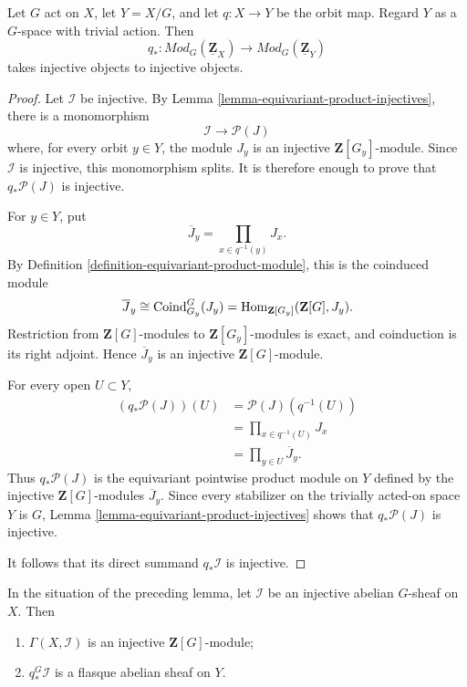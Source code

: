 \begin{lemma}
\label{lemma-pushforward-equivariant-injectives}
\begin{reference}
\cite[Chapter V, \S 5.1, Proposition 5.1.3, p. 198]{Tohoku}
\end{reference}
Let $G$ act on $X$, let $Y = X/G$, and let
$q : X \to Y$ be the orbit map. Regard $Y$ as a $G$-space with trivial
action. Then
$$
q_* :
\textit{Mod}_G(\underline{\mathbf{Z}}_X)
\longrightarrow
\textit{Mod}_G(\underline{\mathbf{Z}}_Y)
$$
takes injective objects to injective objects.
\end{lemma}

\begin{proof}
Let $\mathcal{I}$ be injective. By Lemma
\ref{lemma-equivariant-product-injectives}, there is a monomorphism
$$
\mathcal{I}\longrightarrow\mathcal{P}(J)
$$
where, for every orbit $y \in Y$, the module $J_y$ is an injective
$\mathbf{Z}[G_y]$-module. Since $\mathcal{I}$ is injective, this
monomorphism splits. It is therefore enough to prove that
$q_*\mathcal{P}(J)$ is injective.

For $y \in Y$, put
$$
\overline J_y = \prod_{x \in q^{-1}(y)}J_x.
$$
By Definition \ref{definition-equivariant-product-module}, this is the
coinduced module
$$
\overline J_y
\cong
\operatorname{Coind}_{G_y}^G(J_y)
=
\mathop{\mathrm{Hom}}\nolimits_{\mathbf{Z}[G_y]}(\mathbf{Z}[G], J_y).
$$
Restriction from $\mathbf{Z}[G]$-modules to
$\mathbf{Z}[G_y]$-modules is exact, and coinduction is its right adjoint.
Hence $\overline J_y$ is an injective $\mathbf{Z}[G]$-module.

For every open $U \subset Y$,
$$
\begin{aligned}
(q_*\mathcal{P}(J))(U)
&=
\mathcal{P}(J)(q^{-1}(U)) \\
&=
\prod_{x \in q^{-1}(U)}J_x \\
&=
\prod_{y \in U}\overline J_y.
\end{aligned}
$$
Thus $q_*\mathcal{P}(J)$ is the equivariant pointwise product module on
$Y$ defined by the injective $\mathbf{Z}[G]$-modules
$\overline J_y$. Since every stabilizer on the trivially acted-on space
$Y$ is $G$, Lemma \ref{lemma-equivariant-product-injectives} shows that
$q_*\mathcal{P}(J)$ is injective.

It follows that its direct summand $q_*\mathcal{I}$ is injective.
\end{proof}

\begin{lemma}
\label{lemma-equivariant-injective-sections-invariants}
\begin{reference}
\cite[Chapter V, \S 5.1, Corollary to Proposition 5.1.3, p. 198]{Tohoku}
\end{reference}
In the situation of the preceding lemma, let $\mathcal{I}$ be an
injective abelian $G$-sheaf on $X$. Then
\begin{enumerate}
\item $\Gamma(X, \mathcal{I})$ is an injective
$\mathbf{Z}[G]$-module;
\item $q_*^G\mathcal{I}$ is a flasque abelian sheaf on $Y$.
\end{enumerate}
\end{lemma}

